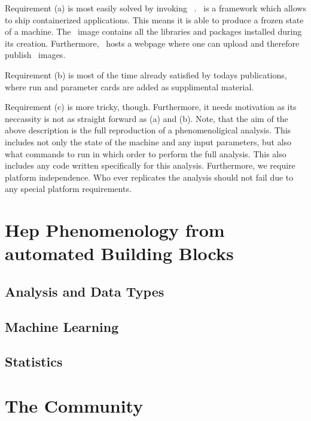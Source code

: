 Requirement (a) is most easily solved by invoking
\docker~\cite{}. \docker~is a framework which allows to ship
containerized applications. This means it is able to produce a frozen
state of a machine. The \docker~image contains all the libraries and
packages installed during its creation. Furthermore, \docker~hosts a
webpage where one can upload and therefore publish \docker~images.

Requirement (b) is most of the time already satisfied by todays
publications, where run and parameter cards are added as supplimental
material.

Requirement (c) is more tricky, though. Furthermore, it needs
motivation as its neccassity is not as straight forward as (a) and
(b). Note, that the aim of the above description is the full
reproduction of a phenomenoligical analysis. This includes not only
the state of the machine and any input parameters, but also what
commands to run in which order to perform the full analysis. This also
includes any code written specifically for this analysis. Furthermore,
we require platform independence. Who ever replicates the analysis
should not fail due to any special platform requirements.


\section{Hep Phenomenology from automated Building Blocks}

\subsection{Analysis and Data Types}

\subsection{Machine Learning}

\subsection{Statistics}


\section{The Community}
